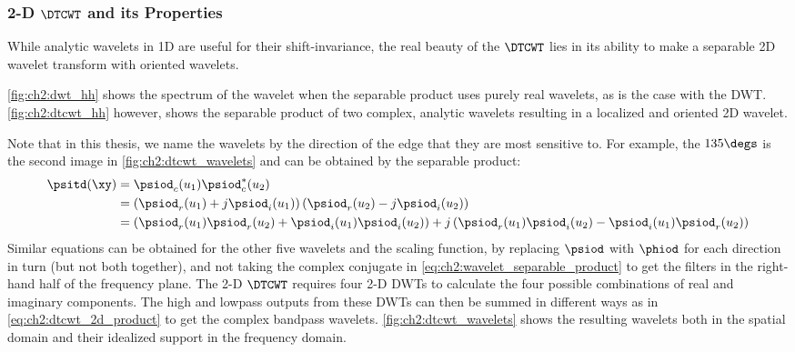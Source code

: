 \subsubsection{2-D $\DTCWT$ and its Properties}
  While analytic wavelets in 1D are useful for their shift-invariance, the real
  beauty of the $\DTCWT$ lies in its ability to make a separable 2D wavelet
  transform with oriented wavelets.

  \autoref{fig:ch2:dwt_hh} shows the spectrum of
  the wavelet when the separable product uses purely real wavelets, as is the
  case with the DWT\@. \autoref{fig:ch2:dtcwt_hh} however, shows the separable
  product of two complex, analytic wavelets resulting in a localized and
  oriented 2D wavelet.

  Note that in this thesis, we name the wavelets by the direction of the edge
  that they are most sensitive to.
  For example, the $135\degs$ is the second image in \autoref{fig:ch2:dtcwt_wavelets} and
  can be obtained by the separable product:
  \begin{align}
    \psitd(\xy) &= \psiod_c(u_1) \psiod_c^*(u_2) \label{eq:ch2:wavelet_separable_product}\\
              &= \left(\psiod_r(u_1) + j\psiod_i(u_1)\right)
                 \left(\psiod_r(u_2) - j\psiod_i(u_2)\right) \\
              &= \left(\psiod_r(u_1)\psiod_r(u_2) + \psiod_i(u_1)\psiod_i(u_2)\right)
                +j \left(\psiod_r(u_1)\psiod_i(u_2) - \psiod_i(u_1)\psiod_r(u_2)\right)
                \label{eq:ch2:dtcwt_2d_product}
  \end{align}
  Similar equations can be obtained for the other five wavelets and the scaling
  function, by replacing $\psiod$ with $\phiod$ for each direction in turn (but not both
  together), and not taking the complex conjugate
  in \eqref{eq:ch2:wavelet_separable_product} to get the filters in the
  right-hand half of the frequency plane. The 2-D $\DTCWT$ requires four 2-D
  DWTs to calculate the four possible combinations of real and imaginary
  components. The high and lowpass outputs from these DWTs can then be summed in
  different ways as in \eqref{eq:ch2:dtcwt_2d_product} to get the complex
  bandpass wavelets. \autoref{fig:ch2:dtcwt_wavelets} shows the resulting
  wavelets both in the spatial domain and their idealized support in the
  frequency domain.


